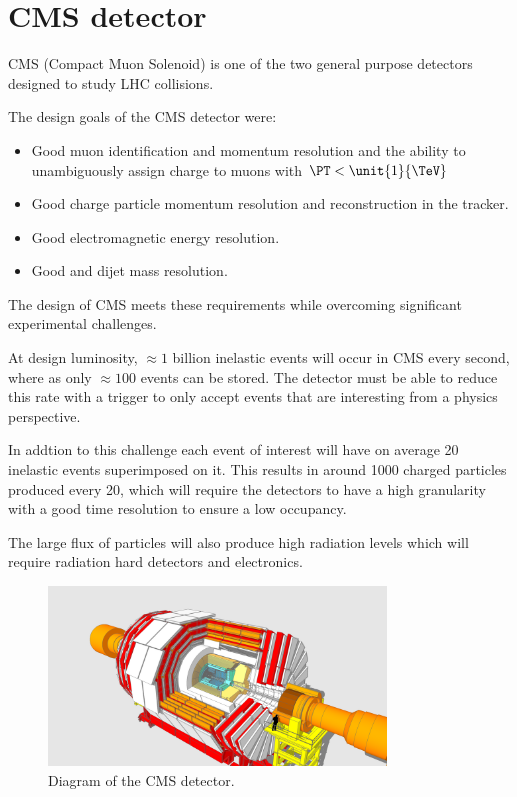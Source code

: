\section{CMS detector}
CMS (Compact Muon Solenoid)\cite{cms} is one of the two general purpose
detectors designed to study LHC collisions. 


The design goals of the CMS detector were: 

\begin{itemize}
  \item Good muon identification and momentum resolution and the ability to unambiguously assign charge to muons with $\PT <
\unit{1}{\TeV}$
  \item Good charge particle momentum resolution and reconstruction in the
tracker.
  \item Good electromagnetic energy resolution. 
  \item Good \ETmiss and dijet mass resolution.
\end{itemize}

The design of CMS meets these requirements while overcoming significant
experimental challenges. 

At design luminosity, $\approx 1 $ billion inelastic events will occur in CMS
every second, where as only $\approx 100 $ events can be stored. The detector
must be able to reduce this rate with a trigger to only accept events that are
interesting from a physics perspective.

In addtion to this challenge each event of interest will have on average 20
inelastic events superimposed on it. This results in around 1000 charged
particles produced every \unit{20}{\ns}, which will require the detectors to
have a high granularity with a good time resolution to ensure a low occupancy.

The large flux of particles will also produce high radiation levels which will
require radiation hard detectors and electronics.

\begin{figure}[htb!]
  \centering
  \includegraphics[width=0.8\textwidth]{muon.png}
  \caption{Diagram of the CMS detector. }
  \label{fig:CMSnc}
\end{figure}


